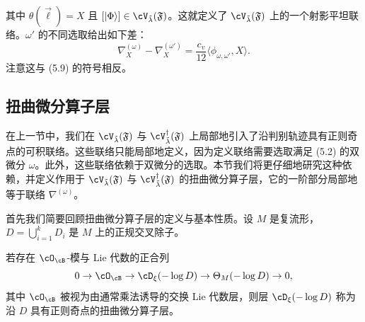 
其中 $\theta(\vec\ell)=X$ 且 $[|\Phi\rangle]\in\cV_{\tilde\lambda}(\mathfrak F)$。这就定义了 $\cV_{\tilde\lambda}(\mathfrak F)$ 上的一个射影平坦联络。$\omega'$ 的不同选取给出如下差：
\begin{equation}
 \nabla^{(\omega)}_X-\nabla^{(\omega')}_X=\frac{c_v}{12}\langle\phi_{\omega,\omega'},X\rangle. \tag{5.11}
\end{equation}
注意这与 (5.9) 的符号相反。

\subsection{扭曲微分算子层}

在上一节中，我们在 $\cV_{\tilde\lambda}(\mathfrak F)$ 与 $\cV^\dagger_{\tilde\lambda}(\mathfrak F)$ 上局部地引入了沿判别轨迹具有正则奇点的可积联络。这些联络只能局部地定义，因为定义联络需要选取满足 (5.2) 的双微分 $\omega$。此外，这些联络依赖于双微分的选取。本节我们将更仔细地研究这种依赖，并定义作用于 $\cV_{\tilde\lambda}(\mathfrak F)$ 与 $\cV^\dagger_{\tilde\lambda}(\mathfrak F)$ 的扭曲微分算子层，它的一阶部分局部地等于联络 $\nabla^{(\omega)}$。

首先我们简要回顾扭曲微分算子层的定义与基本性质。设 $M$ 是复流形，$D=\bigcup_{i=1}^{k}D_i$ 是 $M$ 上的正规交叉除子。

\begin{definition}[5.8]
 若存在 $\cO_\cB$-模与 Lie 代数的正合列
 \[
  0\to\cO_\cB\to\cD_\xi(-\log D)\to\Theta_M(-\log D)\to0,
 \]
 其中 $\cO_\cB$ 被视为由通常乘法诱导的交换 Lie 代数层，则层 $\cD_\xi(-\log D)$ 称为沿 $D$ 具有正则奇点的扭曲微分算子层。
\end{definition}


